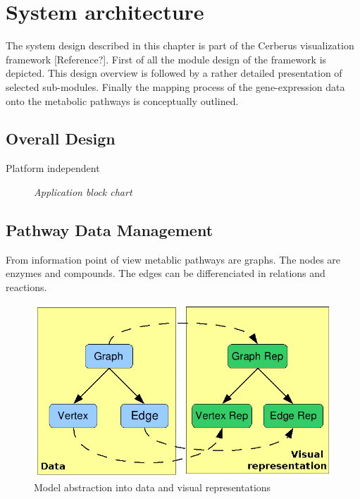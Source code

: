 \chapter{System architecture}

The system design described in this chapter is part of the Cerberus visualization framework [Reference?]. First of all the module design of the framework is depicted. This design overview is followed by a rather detailed presentation of selected sub-modules. Finally the mapping process of the gene-expression data onto the metabolic pathways is conceptually outlined.

\section{Overall Design}

Platform independent

\begin{figure}[ht]
\centering
{} 
\caption[Application block chart]{\textit{Application block chart}} 
\label{gfx:application_block_chart}
\end{figure}

\section{Pathway Data Management}

From information point of view metablic pathways are graphs. The nodes are enzymes and compounds. The edges can be differenciated in relations and reactions.

\begin{figure}[ht]
  \centering
    \includegraphics[width=0.5\linewidth]{gfx/model_view_data_diagram}
  \caption{Model abstraction into data and visual representations}
  \label{fig:model_view_data_diagram}
\end{figure}

